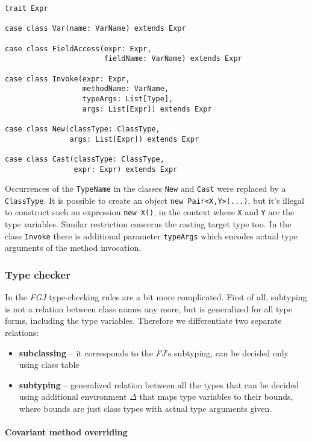 \documentclass{article}[12pt]
\begin{document}
\begin{verbatim}
trait Expr

case class Var(name: VarName) extends Expr

case class FieldAccess(expr: Expr,
                       fieldName: VarName) extends Expr

case class Invoke(expr: Expr,
                  methodName: VarName,
                  typeArgs: List[Type],
                  args: List[Expr]) extends Expr

case class New(classType: ClassType,
               args: List[Expr]) extends Expr

case class Cast(classType: ClassType,
                expr: Expr) extends Expr
\end{verbatim}

Occurrences of the \texttt{TypeName} in the classes \texttt{New}
and \texttt{Cast} were replaced by a \texttt{ClassType}. It is possible
to create an object \texttt{new Pair<X,Y>(...)}, but it's illegal
to construct such an expression \texttt{new X()}, in the context
where \texttt{X} and \texttt{Y} are the type variables. Similar
restriction concerns the casting target type too. In the class \texttt{Invoke} there is additional parameter \texttt{typeArgs}
which encodes actual type arguments of the method invocation.

\subsubsection{Type checker}

In the \emph{FGJ} type-checking rules are a bit more complicated.
First of all, subtyping is not a relation between class names any
more, but is generalized for all type forms, including the type
variables. Therefore we differentiate two separate relations:

\begin{itemize}
\item{\textbf{subclassing}} -- it corresponds to the \emph{FJ}'s
  subtyping, can be decided only using class table
\item{\textbf{subtyping}} -- generalized relation between all
  the types that can be decided using additional environment $\Delta$
  that maps type variables to their bounds, where bounds are
  just class types with actual type arguments given.
\end{itemize}

\paragraph{Covariant method overriding}
\end{document}
